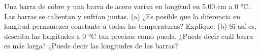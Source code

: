 \item Una barra de cobre y una barra de acero varían en longitud en 5.00 cm a 0 °C. Las barras se calientan y enfrían juntas. (a) ¿Es posible que la diferencia en longitud permanezca constante a todas las temperaturas? Explique. (b) Si así es, describa las longitudes a 0 °C tan precisas como pueda. ¿Puede decir cuál barra es más larga? ¿Puede decir las longitudes de las barras?
